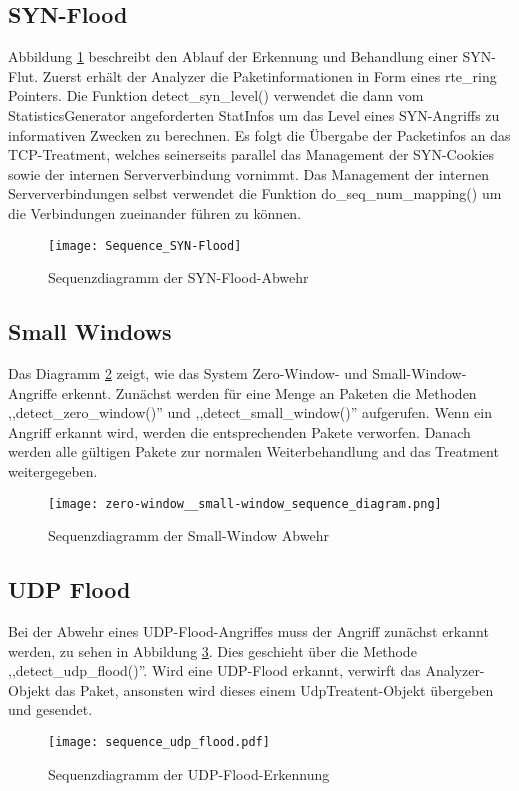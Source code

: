 \documentclass[../review_1.tex]{subfiles}
\begin{document}
\subsection{SYN-Flood}
Abbildung \ref{fig:sequencesyn-flood} beschreibt den Ablauf der Erkennung und Behandlung einer SYN-Flut. Zuerst erhält der Analyzer die Paketinformationen in Form eines rte\_ring Pointers. Die Funktion detect\_syn\_level() verwendet die dann vom StatisticsGenerator angeforderten StatInfos um das Level eines SYN-Angriffs zu informativen Zwecken zu berechnen. Es folgt die Übergabe der Packetinfos an das TCP-Treatment, welches seinerseits parallel das Management der SYN-Cookies sowie der internen Serververbindung vornimmt. Das Management der internen Serververbindungen selbst verwendet die Funktion do\_seq\_num\_mapping() um die Verbindungen zueinander führen zu können.

\begin{figure}[t]
    \centering
    \texttt{[image: Sequence\_SYN-Flood]}
    \caption{Sequenzdiagramm der SYN-Flood-Abwehr}
    \label{fig:sequencesyn-flood}
\end{figure}

\subsection{Small Windows}

Das Diagramm \ref{fig:sequence-smallwin} zeigt, wie das System Zero-Window- und Small-Window-Angriffe erkennt. Zunächst werden für eine Menge an Paketen die Methoden ,,detect\_zero\_window()'' und ,,detect\_small\_window()'' aufgerufen. Wenn ein Angriff erkannt wird, werden die entsprechenden Pakete verworfen. Danach werden alle gültigen Pakete zur normalen Weiterbehandlung and das Treatment weitergegeben.

\begin{figure}[t]
	\centering
	\texttt{[image: zero-window\_\_small-window\_sequence\_diagram.png]}
	\caption{Sequenzdiagramm der Small-Window Abwehr}
	\label{fig:sequence-smallwin}
\end{figure}


\subsection{UDP Flood}
Bei der Abwehr eines UDP-Flood-Angriffes muss der Angriff zunächst erkannt werden, zu sehen in Abbildung \ref{fig:UDP-Flood-Erkennung}. Dies geschieht über die Methode ,,detect\_udp\_flood()''. Wird eine UDP-Flood erkannt, verwirft das Analyzer-Objekt das Paket, ansonsten wird dieses einem UdpTreatent-Objekt übergeben und gesendet.

\begin{figure}[t]
    \centering
    \texttt{[image: sequence\_udp\_flood.pdf]}
    \caption{Sequenzdiagramm der UDP-Flood-Erkennung}
    \label{fig:UDP-Flood-Erkennung}
\end{figure}
\end{document}
